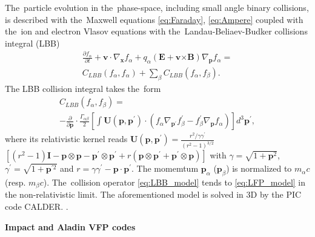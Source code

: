 \documentclass[
 aps,
 jmp,
 amsmath,amssymb,
 twocolumn,
]{revtex4-1}
\newcommand{\vect}[1]{\boldsymbol{#1}}
\begin{document}
The~particle evolution in the~phase-space, including small angle 
binary collisions, is described with 
the~Maxwell equations \eqref{eq:Faraday}, \eqref{eq:Ampere}
coupled with the~ion and electron Vlasov equations with 
the~Landau-Beliaev-Budker collisions integral (LBB)
\cite{Landau_1936, Beliaev_SPD1956} 
\begin{multline}
\frac{\partial f_\alpha}{\partial t}+\mathbf{v}\cdot\nabla_{\mathbf{x}}f_\alpha+q_\alpha\left(\mathbf{E}+\mathbf{v}\vect{\times}\mathbf{B}\right)\nabla_{\mathbf{p}}f_\alpha =
\\
C_{LBB}(f_\alpha,f_\alpha)+\sum_\beta C_{LBB}(f_\alpha,f_\beta)
.
\end{multline}
The LBB collision integral takes the~form
\begin{multline}
C_{LBB}(f_\alpha,f_\beta)=
\\
-\frac{\partial}{\partial \mathbf{p}}\cdot\frac{\Gamma_{\alpha\beta}}{2}\left[\int \mathbf{U}(\mathbf{p},\mathbf{p}^\prime)\cdot(f_\alpha\nabla_{\mathbf{p}^\prime}f_\beta^\prime-f_\beta^\prime\nabla_{\mathbf{p}}f_\alpha)\right]d^3\mathbf{p}^\prime
,
\label{eq:LBB_model}
\end{multline}
where its relativistic kernel reads
$\mathbf{U}(\mathbf{p},\mathbf{p}^\prime)=\frac{r^2/\gamma\gamma^\prime}{(r^2-1)^{3/2}}$ 
$\left[(r^2-1)\mathbf{I}-\mathbf{p}\otimes\mathbf{p}-\mathbf{p}^\prime\otimes\mathbf{p}^\prime+r(\mathbf{p}\otimes\mathbf{p}^\prime+\mathbf{p}^\prime\otimes\mathbf{p})\right]$
with $\gamma=\sqrt{1+\mathbf{p}^2}$, $\gamma^\prime=\sqrt{1+\mathbf{p}^{\prime 2}}$ and $r=\gamma\gamma^\prime-\mathbf{p}\cdot\mathbf{p}^\prime$. 
The momemtum $\mathbf{p}_\alpha$ ($\mathbf{p}_\beta$) is normalized to 
$m_\alpha c$ (resp. $m_\beta c$). The~collision operator \eqref{eq:LBB_model} 
tends to \eqref{eq:LFP_model} in the non-relativistic limit.
The aforementioned model is solved in 3D by the PIC code CALDER. 
\cite{Lefebvre_NF2003, Perez_PoP2012}.

\textbf{Impact and Aladin VFP codes}
\end{document}
